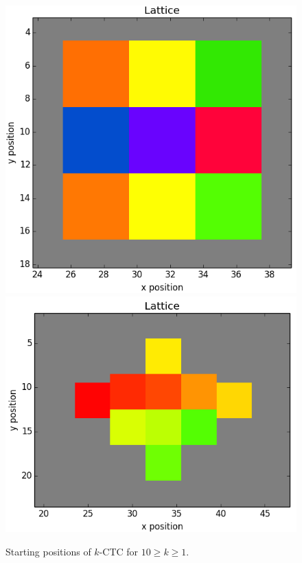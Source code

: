 \documentclass[12pt]{article}
\begin{document}
\begin{figure}[H]
	\includegraphics[scale=0.20]{img/9ctc_start}
	\includegraphics[scale=0.20]{img/10ctc_start}
	\caption{Starting positions of $k$-CTC for $10 \geq k \geq 1$.}
	\label{racestart}
\end{figure}
\end{document}
